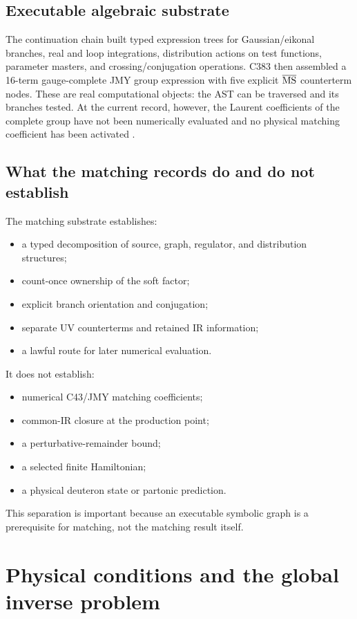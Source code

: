\documentclass[11pt,oneside]{book}
\begin{document}
\section{Executable algebraic substrate}

The continuation chain built typed expression trees for Gaussian/eikonal branches, real and loop integrations, distribution actions on test functions, parameter masters, and crossing/conjugation operations.  C383 then assembled a 16-term gauge-complete JMY group expression with five explicit $\overline{\rm MS}$ counterterm nodes.  These are real computational objects: the AST can be traversed and its branches tested.  At the current record, however, the Laurent coefficients of the complete group have not been numerically evaluated and no physical matching coefficient has been activated \cite{DWC400P1Record2026}.

\section{What the matching records do and do not establish}

The matching substrate establishes:
\begin{itemize}
 \item a typed decomposition of source, graph, regulator, and distribution structures;
 \item count-once ownership of the soft factor;
 \item explicit branch orientation and conjugation;
 \item separate UV counterterms and retained IR information;
 \item a lawful route for later numerical evaluation.
\end{itemize}
It does not establish:
\begin{itemize}
 \item numerical C43/JMY matching coefficients;
 \item common-IR closure at the production point;
 \item a perturbative-remainder bound;
 \item a selected finite Hamiltonian;
 \item a physical deuteron state or partonic prediction.
\end{itemize}
This separation is important because an executable symbolic graph is a prerequisite for matching, not the matching result itself.

\chapter{Physical conditions and the global inverse problem}
\label{chap:inverse-problem}
\end{document}
